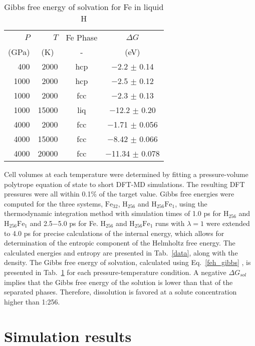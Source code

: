 \begin{table}[h]
    \centering
\caption{Gibbs free energy of solvation for Fe in liquid H\label{solvation}}
\begin{tabular}{rrcc}
    \hline
{$P$} & {$T$} &  {Fe Phase} & {$\Delta G$} \\
(GPa) & (K)~ & - & (eV) \\
\hline
400 \phantom{0}  & 2000  & hcp  &  $-$2.2 $\pm$ 0.14    \\
1000\phantom{0}  & 2000  & hcp  &  $-$2.5 $\pm$ 0.12    \\
1000\phantom{0}  & 2000  & fcc  &  $-$2.3 $\pm$ 0.13    \\
1000\phantom{0}  & 15000 & liq  &  $-$12.2 $\pm$ 0.20\phantom{0}   \\
4000\phantom{0}  & 2000  & fcc  &  $-$1.71 $\pm$ 0.056  \\
4000\phantom{0}  & 15000 & fcc  &  $-$8.42 $\pm$ 0.066  \\
4000\phantom{0} & 20000 & fcc  &  $-$11.34 $\pm$ 0.078\phantom{0} \\
\hline
\end{tabular}
\end{table}


Cell volumes at each temperature were determined by fitting a pressure-volume
polytrope equation of state to short DFT-MD simulations. The resulting DFT
pressures were all within 0.1\% of the target value. Gibbs free energies were
computed for the three systems, $\mathrm{Fe}_{32}$, $\mathrm{H}_{256}$ and
$\mathrm{H}_{256}\mathrm{Fe}_1$, using the thermodynamic integration method
with simulation times of 1.0 ps for $\mathrm{H}_{256}$ and
$\mathrm{H}_{256}\mathrm{Fe}_1$ and 2.5$-$5.0 ps for Fe. $\mathrm{H}_{256}$ and
$\mathrm{H}_{256}\mathrm{Fe}_1$ runs with $\lambda =1$ were extended to 4.0 ps
for precise calculations of the internal energy, which allows for determination
of the entropic component of the Helmholtz free energy. The calculated energies
and entropy are presented in Tab.~\ref{data}, along with the density.  The Gibbs free
energy of solvation, calculated using Eq.~\ref{feh_gibbs} , is presented in Tab.~\ref{solvation} for each
pressure-temperature condition. A negative $\Delta G_{sol}$ implies that the
Gibbs free energy of the solution is lower than that of the separated phases.
Therefore, dissolution is favored at a solute concentration higher than 1:256. 


\section{Simulation results}

